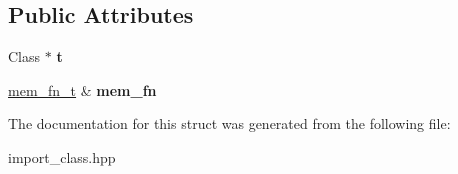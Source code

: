 \subsection*{Public Attributes}
\begin{DoxyCompactItemize}
\item 
\mbox{\label{a01656_a0f97c51dfca93a4764899a384228cfac}} 
Class $\ast$ {\bfseries t}
\item 
\mbox{\label{a01656_a96f3841b075c1e9e2bf3793d1d7da316}} 
\hyperlink{a01672}{mem\+\_\+fn\+\_\+t} \& {\bfseries mem\+\_\+fn}
\end{DoxyCompactItemize}


The documentation for this struct was generated from the following file\+:\begin{DoxyCompactItemize}
\item 
import\+\_\+class.\+hpp\end{DoxyCompactItemize}
